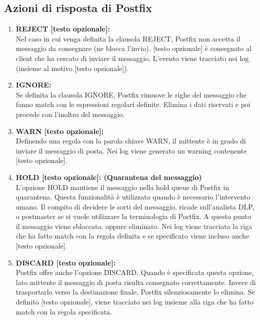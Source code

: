   \begin{table}[htp]
    \subsection{Azioni di risposta di Postfix}
  \begin{enumerate}[label=\textbf{\arabic*})]
      \item{\textbf{REJECT [testo opzionale]:}}\\
      Nel caso in cui venga definita la clausola REJECT, Postfix non accetta il messaggio 
      da consegnare (ne blocca l'invio).
      [testo opzionale] è consegnato al client che ha cercato di inviare il messaggio.
      L'evento viene tracciato nei log (insieme al motivo [testo opzionale]).
  
      \item{\textbf{IGNORE:}}\\
      Se definita la clausola IGNORE, Postfix rimuove le righe del messaggio che fanno match con 
      le espressioni regolari definite. Elimina i dati riservati e poi procede con l'inoltro del 
      messaggio.
      
      \item{\textbf{WARN [testo opzionale]:}}\\
      Definendo una regola con la parola chiave WARN, il mittente è in grado di inviare il messaggio di 
      posta. Nei log viene generato un warning contenente [testo opzionale].
      
      \item{\textbf{HOLD [testo opzionale]: (Quarantena del messaggio)}}\\
      L'opzione HOLD mantiene il messaggio nella hold queue di Postfix in quarantena. Questa funzionalità
      è utilizzata quando è necessario l'intervento umano. Il compito di decidere le sorti del messaggio,
      ricade sull'analista DLP, o postmaster se si vuole utilizzare la terminologia di Postfix. A questo punto
      il messaggio viene sbloccato, oppure eliminato.
      Nei log viene tracciata la riga che ha fatto match con la regola definita e se specificato viene incluso
      anche [testo opzionale].
      
      
      \item{\textbf{DISCARD [testo opzionale]:}}\\
      Postfix offre anche l'opzione DISCARD. Quando è specificata questa opzione, lato mittente il 
      messaggio di posta risulta consegnato correttamente. Invece di trasportarlo verso la destinazione finale, 
      Postfix silenziosamente lo elimina.
      Se definito [testo opzionale], viene tracciato nei log insieme alla riga che ha fatto match con la regola 
      specificata. 
      

\end{enumerate}
\end{table}
